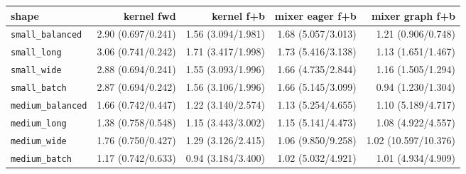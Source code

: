 \begin{tabular}{l r r r r }
\toprule
shape & kernel fwd & kernel f+b & mixer eager f+b & mixer graph f+b \\
\midrule
\texttt{small\_balanced} & 2.90 (0.697/0.241) & 1.56 (3.094/1.981) & 1.68 (5.057/3.013) & 1.21 (0.906/0.748) \\
\texttt{small\_long} & 3.06 (0.741/0.242) & 1.71 (3.417/1.998) & 1.73 (5.416/3.138) & 1.13 (1.651/1.467) \\
\texttt{small\_wide} & 2.88 (0.694/0.241) & 1.55 (3.093/1.996) & 1.66 (4.735/2.844) & 1.16 (1.505/1.294) \\
\texttt{small\_batch} & 2.87 (0.694/0.242) & 1.56 (3.106/1.996) & 1.66 (5.145/3.099) & 0.94 (1.230/1.304) \\
\texttt{medium\_balanced} & 1.66 (0.742/0.447) & 1.22 (3.140/2.574) & 1.13 (5.254/4.655) & 1.10 (5.189/4.717) \\
\texttt{medium\_long} & 1.38 (0.758/0.548) & 1.15 (3.443/3.002) & 1.15 (5.141/4.473) & 1.08 (4.922/4.557) \\
\texttt{medium\_wide} & 1.76 (0.750/0.427) & 1.29 (3.126/2.415) & 1.06 (9.850/9.258) & 1.02 (10.597/10.376) \\
\texttt{medium\_batch} & 1.17 (0.742/0.633) & 0.94 (3.184/3.400) & 1.02 (5.032/4.921) & 1.01 (4.934/4.909) \\
\bottomrule
\end{tabular}
